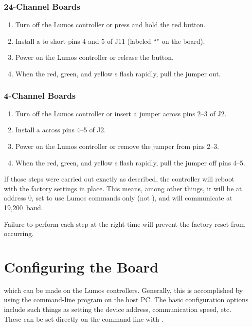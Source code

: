 \documentclass[letterpaper,twoside,onecolumn,openright,final]{memoir}
\begin{document}
\subsection{24-Channel Boards}
\begin{enumerate}
	\item	Turn off the Lumos controller or press and hold the red  button.
	\item	Install a  to short pins 4 and 5 of J11 (labeled ``''
		on the board).
	\item	Power on the Lumos controller or release the  button.
	\item	When the red, green, and yellow s flash rapidly, pull the
		jumper out.
\end{enumerate}
\subsection{4-Channel Boards}
\begin{enumerate}
	\item	Turn off the Lumos controller or insert a jumper across pins 2--3 of J2.
	\item	Install a  across pins 4--5 of J2.
	\item	Power on the Lumos controller or remove the jumper from pins 2--3.
	\item	When the red, green, and yellow s flash rapidly, pull the
		jumper off pins 4--5.
\end{enumerate}

If those steps were carried out exactly as described, %
the controller will reboot with the factory settings in place.  This means, among other things,
it will be at address 0, set to use Lumos commands only (not ), and will communicate
at 19,200~baud.

Failure to perform each step at the right time will prevent the factory reset from occurring.

\chapter{Configuring the Board}
 which can be made on the Lumos controllers.  Generally,
this is accomplished by using the  com\-mand-line program on the host PC.  The basic configuration
options include such things as setting the device address, communication speed, etc.  These can be set
directly on the command line with .
\end{document}
